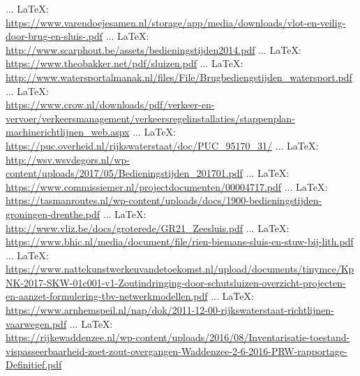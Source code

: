 \begin{thebibliography}{99}
{{{{{{{					%
						 ... \LaTeX:\\ \url{https://www.varendoejesamen.nl/storage/app/media/downloads/vlot-en-veilig-door-brug-en-sluis-.pdf}
						 ... \LaTeX:\\ \url{http://www.scarphout.be/assets/bedieningstijden2014.pdf}
						 ... \LaTeX:\\ \url{https://www.theobakker.net/pdf/sluizen.pdf}
						 ... \LaTeX:\\ \url{http://www.watersportalmanak.nl/files/File/Brugbediengstijden_watersport.pdf}
						 ... \LaTeX:\\ \url{https://www.crow.nl/downloads/pdf/verkeer-en-vervoer/verkeersmanagement/verkeersregelinstallaties/stappenplan-machinerichtlijnen_web.aspx}
						 ... \LaTeX:\\ \url{https://puc.overheid.nl/rijkswaterstaat/doc/PUC_95170_31/}
						 ... \LaTeX:\\ \url{http://wsv.wsvdegors.nl/wp-content/uploads/2017/05/Bedieningstijden_201701.pdf}
						 ... \LaTeX:\\ \url{https://www.commissiemer.nl/projectdocumenten/00004717.pdf}
						 ... \LaTeX:\\ \url{https://tasmanroutes.nl/wp-content/uploads/docs/1900-bedieningstijden-groningen-drenthe.pdf}
						 ... \LaTeX:\\ \url{http://www.vliz.be/docs/groterede/GR21_Zeesluis.pdf}
						 ... \LaTeX:\\ \url{https://www.bhic.nl/media/document/file/rien-biemans-sluis-en-stuw-bij-lith.pdf}
						 ... \LaTeX:\\ \url{https://www.nattekunstwerkenvandetoekomst.nl/upload/documents/tinymce/KpNK-2017-SKW-01c001-v1-Zoutindringing-door-schutsluizen-overzicht-projecten-en-aanzet-formulering-tbv-netwerkmodellen.pdf}
						 ... \LaTeX:\\ \url{https://www.arnhemspeil.nl/nap/dok/2011-12-00-rijkswaterstaat-richtlijnen-vaarwegen.pdf}
						 ... \LaTeX:\\ \url{https://rijkewaddenzee.nl/wp-content/uploads/2016/08/Inventarisatie-toestand-vispasseerbaarheid-zoet-zout-overgangen-Waddenzee-2-6-2016-PRW-rapportage-Definitief.pdf}
}}}}}}}
\end{thebibliography}
